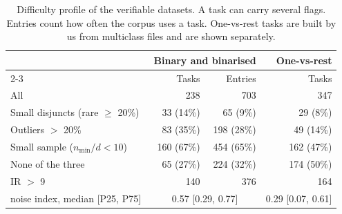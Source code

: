 \begin{table}[t]
\centering\small
\caption{Difficulty profile of the verifiable datasets. A task can carry several flags.
Entries count how often the corpus uses a task. One-vs-rest tasks are built by us from
multiclass files and are shown separately.}
\label{tab:data-difficulty}
\begin{tabular}{lrrr}
\toprule
 & \multicolumn{2}{c}{Binary and binarised} & One-vs-rest\\
\cmidrule(lr){2-3}
 & Tasks & Entries & Tasks\\
\midrule
All & 238 & 703 & 347\\
Small disjuncts (rare $\geq$ 20\%)~\citep{napierala2016types} & 33 (14\%) & 65 (9\%) & 29 (8\%)\\
Outliers $>$ 20\%~\citep{napierala2016types} & 83 (35\%) & 198 (28\%) & 49 (14\%)\\
Small sample ($n_{\min}/d < 10$)~\citep{jain2000statistical} & 160 (67\%) & 454 (65\%) & 162 (47\%)\\
None of the three & 65 (27\%) & 224 (32\%) & 174 (50\%)\\
\addlinespace
IR $>$ 9~\citep{fernandez2008study} & 140 & 376 & 164\\
\addlinespace
noise index, median [P25, P75] & \multicolumn{2}{c}{0.57 [0.29, 0.77]} & 0.29 [0.07, 0.61]\\
\bottomrule
\end{tabular}
\end{table}
